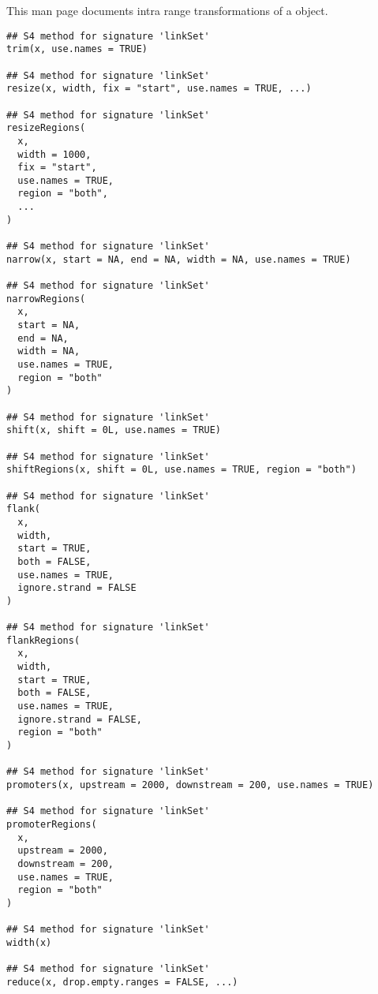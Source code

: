 \documentclass[letterpaper]{book}
\begin{document}
%
\begin{Description}
This man page documents intra range transformations of a  object.
\end{Description}
%
\begin{Usage}
\begin{verbatim}
## S4 method for signature 'linkSet'
trim(x, use.names = TRUE)

## S4 method for signature 'linkSet'
resize(x, width, fix = "start", use.names = TRUE, ...)

## S4 method for signature 'linkSet'
resizeRegions(
  x,
  width = 1000,
  fix = "start",
  use.names = TRUE,
  region = "both",
  ...
)

## S4 method for signature 'linkSet'
narrow(x, start = NA, end = NA, width = NA, use.names = TRUE)

## S4 method for signature 'linkSet'
narrowRegions(
  x,
  start = NA,
  end = NA,
  width = NA,
  use.names = TRUE,
  region = "both"
)

## S4 method for signature 'linkSet'
shift(x, shift = 0L, use.names = TRUE)

## S4 method for signature 'linkSet'
shiftRegions(x, shift = 0L, use.names = TRUE, region = "both")

## S4 method for signature 'linkSet'
flank(
  x,
  width,
  start = TRUE,
  both = FALSE,
  use.names = TRUE,
  ignore.strand = FALSE
)

## S4 method for signature 'linkSet'
flankRegions(
  x,
  width,
  start = TRUE,
  both = FALSE,
  use.names = TRUE,
  ignore.strand = FALSE,
  region = "both"
)

## S4 method for signature 'linkSet'
promoters(x, upstream = 2000, downstream = 200, use.names = TRUE)

## S4 method for signature 'linkSet'
promoterRegions(
  x,
  upstream = 2000,
  downstream = 200,
  use.names = TRUE,
  region = "both"
)

## S4 method for signature 'linkSet'
width(x)

## S4 method for signature 'linkSet'
reduce(x, drop.empty.ranges = FALSE, ...)
\end{verbatim}
\end{Usage}
\end{document}
